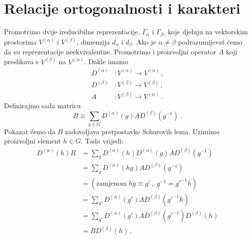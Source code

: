 \section{Relacije ortogonalnosti i karakteri}
\label{sec:ortogonalnost}

Promotrimo dvije ireducibilne reprezentacije, $\Gamma_{\alpha}$ i $\Gamma_{\beta}$,
koje djeluju na vektorskim prostorima $V^{(\alpha)}$ i $V^{(\beta)}$,
dimenzija $d_\alpha$ i $d_\beta$.
Ako je $\alpha\neq\beta$ podrazumijevat ćemo da su reprezentacije neekvivalentne.
Promotrimo i proizvoljni operator $A$ koji preslikava s $V^{(\beta)}$ na  $V^{(\alpha)}$.
Dakle imamo
\begin{align*}
D^{(\alpha)} &: V^{(\alpha)} \to V^{(\alpha)}\,, \\
D^{(\beta)}  &: V^{(\beta)}  \to V^{(\beta)} \,, \\
A          &: V^{(\beta)} \to V^{(\alpha)} \,.
\end{align*}
Definirajmo sada matricu
\begin{equation*}
B\equiv \sum_{g\in G} D^{(\alpha)}(g) A D^{(\beta)}(g^{-1}) \;.
\end{equation*}
Pokazat ćemo da $B$ zadovoljava pretpostavke Schurovih lema.
Uzimimo proizvoljni element $h\in G$. Tada vrijedi:
\begin{equation}
\begin{split}
 D^{(\alpha)}(h)B &= \sum_g D^{(\alpha)}(h) D^{(\alpha)}(g) A
    D^{(\beta)}(g^{-1}) \\
&= \sum_g D^{(\alpha)}(hg) A D^{(\beta)}(g^{-1}) \\
&= ( \textrm{zamjenom}\; hg\equiv g' \, , \; g^{-1}=g'^{-1}h )  \label{eq:gshift} \\
&= \sum_{g'} D^{(\alpha)}(g') A D^{(\beta)}(g'^{-1}h) \\
&= \sum_{g'} D^{(\alpha)}(g') A D^{(\beta)}(g'^{-1}) D^{(\beta)}(h) \\
&= B D^{(\beta)}(h) \,.
\end{split}
\end{equation}

